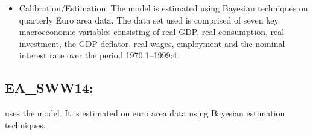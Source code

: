 \documentclass[11pt,a4paper]{article}
\begin{document}
\begin{itemize}
		\item Calibration/Estimation: The model is estimated using Bayesian techniques on quarterly Euro area data.
		The data set used is comprised of seven key macroeconomic variables consisting of real GDP, real consumption, real investment, the GDP deflator, real wages, employment and the nominal interest rate over the period 1970:1--1999:4.
		
		
	\end{itemize}
	
	\subsection{EA\_SWW14: \texorpdfstring{\cite{smets2014warne}}{Smets et al. (2014)}}
	\label{EASWW14}
	\cite{smets2014warne} uses the \cite{gali2012unemployment} model. It is estimated on euro area data using Bayesian estimation techniques.
	
\end{document}
